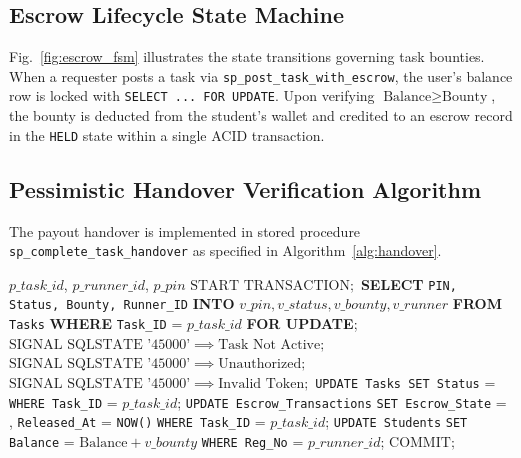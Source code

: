 \documentclass[conference]{IEEEtran}
\begin{document}
\subsection{Escrow Lifecycle State Machine}
Fig.~\ref{fig:escrow_fsm} illustrates the state transitions governing task bounties. When a requester posts a task via \texttt{sp\_post\_task\_with\_escrow}, the user's balance row is locked with \texttt{SELECT ... FOR UPDATE}. Upon verifying $\text{Balance} \ge \text{Bounty}$, the bounty is deducted from the student's wallet and credited to an escrow record in the \texttt{HELD} state within a single ACID transaction.

\subsection{Pessimistic Handover Verification Algorithm}
The payout handover is implemented in stored procedure \texttt{sp\_complete\_task\_handover} as specified in Algorithm~\ref{alg:handover}.

\begin{algorithm}[t]
\caption{Pessimistic Handover \& Escrow Release}
\label{alg:handover}
\begin{algorithmic}[1]
\REQUIRE $p\_task\_id$, $p\_runner\_id$, $p\_pin$
\STATE $\text{START TRANSACTION};$
\STATE \textbf{SELECT} \texttt{PIN, Status, Bounty, Runner\_ID}
\STATE \quad \textbf{INTO} $v\_pin, v\_status, v\_bounty, v\_runner$
\STATE \quad \textbf{FROM} \texttt{Tasks} \textbf{WHERE} \texttt{Task\_ID} = $p\_task\_id$
\STATE \quad \textbf{FOR UPDATE};
    \STATE $\text{SIGNAL SQLSTATE '45000'} \implies \text{Task Not Active};$
\ENDIF
{}
    \STATE $\text{SIGNAL SQLSTATE '45000'} \implies \text{Unauthorized};$
\ENDIF
{}
    \STATE $\text{SIGNAL SQLSTATE '45000'} \implies \text{Invalid Token};$
\ENDIF
\STATE \texttt{UPDATE Tasks SET Status} = 
\STATE \quad \texttt{WHERE Task\_ID} = $p\_task\_id$;
\STATE \texttt{UPDATE Escrow\_Transactions}
\STATE \quad \texttt{SET Escrow\_State} = ,
\STATE \quad \texttt{Released\_At} = \texttt{NOW()}
\STATE \quad \texttt{WHERE Task\_ID} = $p\_task\_id$;
\STATE \texttt{UPDATE Students}
\STATE \quad \texttt{SET Balance} = $\text{Balance} + v\_bounty$
\STATE \quad \texttt{WHERE Reg\_No} = $p\_runner\_id$;
\STATE $\text{COMMIT};$
\end{algorithmic}
\end{algorithm}
\end{document}
